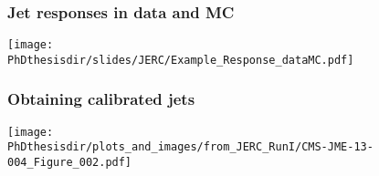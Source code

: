 \begin{frame}
\frametitle{Jet responses in data and MC}
\begin{center}
\texttt{[image: \\PhDthesisdir/slides/JERC/Example\_Response\_dataMC.pdf]}
\end{center}
\end{frame}

\begin{frame}
\frametitle{Obtaining calibrated jets}
\begin{center}
\texttt{[image: \\PhDthesisdir/plots\_and\_images/from\_JERC\_RunI/CMS-JME-13-004\_Figure\_002.pdf]}
\end{center}
\end{frame}